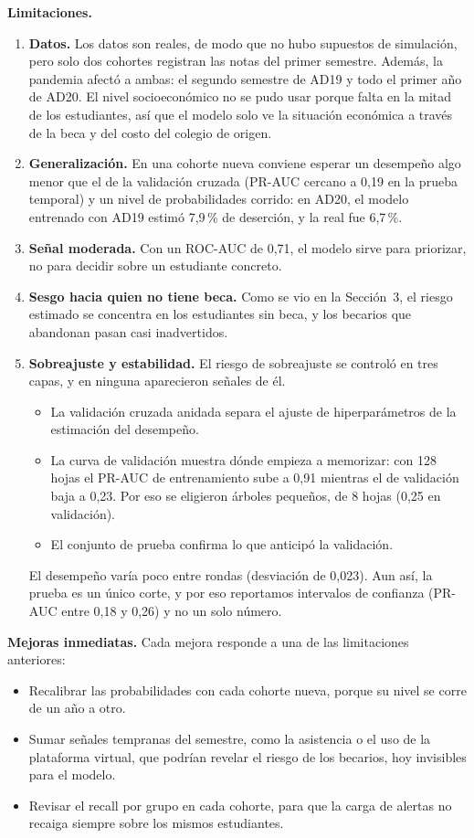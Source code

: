\documentclass[11pt,a4paper]{article}
\begin{document}
\textbf{Limitaciones.}
\begin{enumerate}[leftmargin=1.5em,itemsep=1pt,topsep=2pt]
\item \textbf{Datos.} Los datos son reales, de modo que no hubo supuestos de simulación, pero solo dos cohortes registran las notas del primer semestre. Además, la pandemia afectó a ambas: el segundo semestre de AD19 y todo el primer año de AD20. El nivel socioeconómico no se pudo usar porque falta en la mitad de los estudiantes, así que el modelo solo ve la situación económica a través de la beca y del costo del colegio de origen.
\item \textbf{Generalización.} En una cohorte nueva conviene esperar un desempeño algo menor que el de la validación cruzada (PR-AUC cercano a 0,19 en la prueba temporal) y un nivel de probabilidades corrido: en AD20, el modelo entrenado con AD19 estimó 7,9\,\% de deserción, y la real fue 6,7\,\%.
\item \textbf{Señal moderada.} Con un ROC-AUC de 0,71, el modelo sirve para priorizar, no para decidir sobre un estudiante concreto.
\item \textbf{Sesgo hacia quien no tiene beca.} Como se vio en la Sección~3, el riesgo estimado se concentra en los estudiantes sin beca, y los becarios que abandonan pasan casi inadvertidos.
\item \textbf{Sobreajuste y estabilidad.} El riesgo de sobreajuste se controló en tres capas, y en ninguna aparecieron señales de él.
\begin{itemize}[leftmargin=1.2em,itemsep=0pt,topsep=1pt]
\item La validación cruzada anidada separa el ajuste de hiperparámetros de la estimación del desempeño.
\item La curva de validación muestra dónde empieza a memorizar: con 128 hojas el PR-AUC de entrenamiento sube a 0,91 mientras el de validación baja a 0,23. Por eso se eligieron árboles pequeños, de 8 hojas (0,25 en validación).
\item El conjunto de prueba confirma lo que anticipó la validación.
\end{itemize}
El desempeño varía poco entre rondas (desviación de 0,023). Aun así, la prueba es un único corte, y por eso reportamos intervalos de confianza (PR-AUC entre 0,18 y 0,26) y no un solo número.
\end{enumerate}

\textbf{Mejoras inmediatas.} Cada mejora responde a una de las limitaciones anteriores:
\begin{itemize}[leftmargin=1.3em,itemsep=1pt,topsep=2pt]
\item Recalibrar las probabilidades con cada cohorte nueva, porque su nivel se corre de un año a otro.
\item Sumar señales tempranas del semestre, como la asistencia o el uso de la plataforma virtual, que podrían revelar el riesgo de los becarios, hoy invisibles para el modelo.
\item Revisar el recall por grupo en cada cohorte, para que la carga de alertas no recaiga siempre sobre los mismos estudiantes.
\end{itemize}
\end{document}
